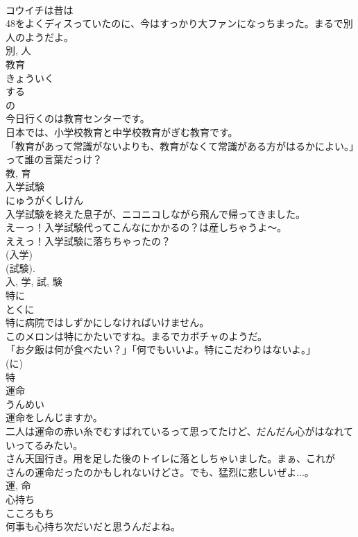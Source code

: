 \documentclass[8pt]{extreport}
\begin{document}
\begin{CJK}{UTF8}{min}
\\	コウイチは昔は
\\	48をよくディスっていたのに、今はすっかり大ファンになっちまった。まるで別人のようだよ。	
\\	別, 人	
\\	教育	
\\	きょういく	
\\	する 
\\	の 
\\	今日行くのは教育センターです。	
\\	日本では、小学校教育と中学校教育がぎむ教育です。	
\\	「教育があって常識がないよりも、教育がなくて常識がある方がはるかによい。」って誰の言葉だっけ？	
\\	教, 育	
\\	入学試験	
\\	にゅうがくしけん	
\\	入学試験を終えた息子が、ニコニコしながら飛んで帰ってきました。	
\\	えーっ！入学試験代ってこんなにかかるの？は産しちゃうよ〜。	
\\	ええっ！入学試験に落ちちゃったの？	
\\	(入学) 
\\	(試験). 
\\	入, 学, 試, 験	
\\	特に	
\\	とくに	
\\	特に病院ではしずかにしなければいけません。	
\\	このメロンは特にかたいですね。まるでカボチャのようだ。	
\\	「お夕飯は何が食べたい？」「何でもいいよ。特にこだわりはないよ。」	
\\	(に) 
\\	特	
\\	運命	
\\	うんめい	
\\	運命をしんじますか。	
\\	二人は運命の赤い糸でむすばれているって思ってたけど、だんだん心がはなれていってるみたい。	
\\	さん天国行き。用を足した後のトイレに落としちゃいました。まぁ、これが
\\	さんの運命だったのかもしれないけどさ。でも、猛烈に悲しいぜよ...。	
\\	運, 命	
\\	心持ち	
\\	こころもち	
\\	何事も心持ち次だいだと思うんだよね。	

\end{CJK}
\end{document}
